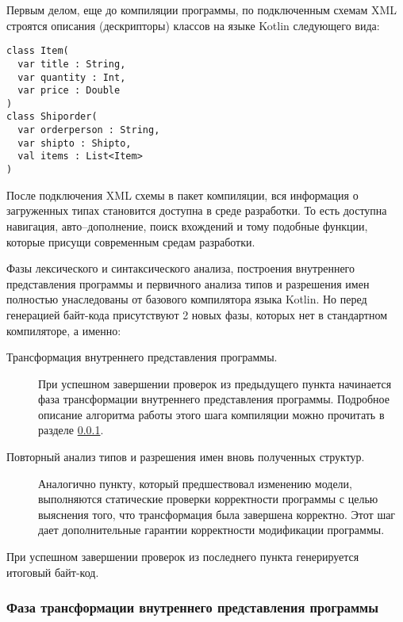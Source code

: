 Первым делом, еще до компиляции программы, по подключенным схемам XML строятся описания (дескрипторы) классов на языке Kotlin следующего вида:

\begin{code}\begin{lstlisting}[caption={Примеры описаний классов для загруженных типов.}, label=xsd-type-descriptors]
class Item(
  var title : String,
  var quantity : Int,
  var price : Double
)
class Shiporder(
  var orderperson : String,
  var shipto : Shipto,
  val items : List<Item>
)
\end{lstlisting}\end{code}

После подключения XML схемы в пакет компиляции, вся информация о загруженных типах становится доступна в среде разработки. То есть доступна навигация, авто--дополнение, поиск вхождений и тому подобные функции, которые присущи современным средам разработки.

Фазы лексического и синтаксического анализа, построения внутреннего представления программы и первичного анализа типов и разрешения имен полностью унаследованы от базового компилятора языка Kotlin. Но перед генерацией байт-кода присутствуют 2 новых фазы, которых нет в стандартном компиляторе, а именно:

\begin{description}
\item[Трансформация внутреннего представления программы.] При успешном завершении проверок из предыдущего пункта начинается фаза трансформации внутреннего представления программы. Подробное описание алгоритма работы этого шага компиляции можно прочитать в разделе \ref{xml-tranformation-phase}.
\item[Повторный анализ типов и разрешения имен вновь полученных структур.]
Аналогично пункту, который предшествовал изменению модели, выполняются статические проверки корректности программы с целью выяснения того, что трансформация была завершена корректно. Этот шаг дает дополнительные гарантии корректности модификации программы.
\end{description}

При успешном завершении проверок из последнего пункта генерируется итоговый байт-код.

\subsubsection{Фаза трансформации внутреннего представления программы}\label{xml-tranformation-phase}

